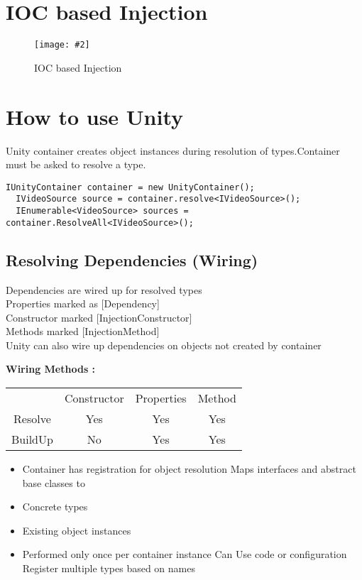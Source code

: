 \documentclass[a4paper,10pt]{scrreprt}
\newcommand{\pic}[2][figure]{\begin{figure}[h]
 \centering
 \texttt{[image: \#2]}
 \caption{#1}
\end{figure}
}
\begin{document}
\section{IOC based Injection}
\pic[IOC based Injection]{iocinj.png}

\section{How to use Unity}
Unity container creates object instances during
resolution of types.Container must be asked to resolve a type.
\begin{lstlisting}[caption= DI Unity First Example]
  IUnityContainer container = new UnityContainer();
  IVideoSource source = container.resolve<IVideoSource>();
  IEnumerable<VideoSource> sources = container.ResolveAll<IVideoSource>();
\end{lstlisting}

\subsection{Resolving Dependencies (Wiring)}
Dependencies are wired up for resolved types\\
Properties marked as [Dependency]\\
Constructor marked [InjectionConstructor]\\
Methods marked [InjectionMethod]\\
Unity can also wire up dependencies on
objects not created by container

\textbf{Wiring Methods :}
\begin{tabular}{|c | c | c | c |}
  & Constructor & Properties & Method \\
  Resolve & Yes & Yes & Yes \\
  BuildUp & No & Yes & Yes \\
  
\end{tabular}
\begin{itemize}

\item Container has registration for object resolution
Maps interfaces and abstract base classes to
\item  Concrete types
\item Existing object instances
\item Performed only once per container instance
Can Use code or configuration
Register multiple types based on names

\end{itemize}
\end{document}
